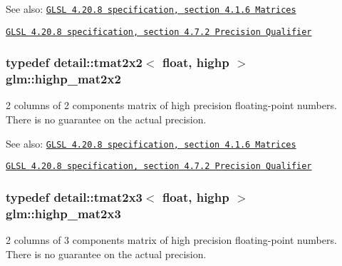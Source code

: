\begin{Desc}
\item[See also:]\href{http://www.opengl.org/registry/doc/GLSLangSpec.4.20.8.pdf}{\tt GLSL 4.20.8 specification, section 4.1.6 Matrices} 

\href{http://www.opengl.org/registry/doc/GLSLangSpec.4.20.8.pdf}{\tt GLSL 4.20.8 specification, section 4.7.2 Precision Qualifier} \end{Desc}
\hypertarget{group__core__precision_g694146b8d430b22caa8b37571d9bc8bc}{
\subsubsection[highp\_\-mat2x2]{\setlength{\rightskip}{0pt plus 5cm}typedef detail::tmat2x2$<$ float, highp $>$ {\bf glm::highp\_\-mat2x2}}}
\label{group__core__precision_g694146b8d430b22caa8b37571d9bc8bc}


2 columns of 2 components matrix of high precision floating-point numbers. There is no guarantee on the actual precision.

\begin{Desc}
\item[See also:]\href{http://www.opengl.org/registry/doc/GLSLangSpec.4.20.8.pdf}{\tt GLSL 4.20.8 specification, section 4.1.6 Matrices} 

\href{http://www.opengl.org/registry/doc/GLSLangSpec.4.20.8.pdf}{\tt GLSL 4.20.8 specification, section 4.7.2 Precision Qualifier} \end{Desc}
\hypertarget{group__core__precision_g7d4e5a1c803be5688c75241c924dfa58}{
\subsubsection[highp\_\-mat2x3]{\setlength{\rightskip}{0pt plus 5cm}typedef detail::tmat2x3$<$ float, highp $>$ {\bf glm::highp\_\-mat2x3}}}
\label{group__core__precision_g7d4e5a1c803be5688c75241c924dfa58}


2 columns of 3 components matrix of high precision floating-point numbers. There is no guarantee on the actual precision.

